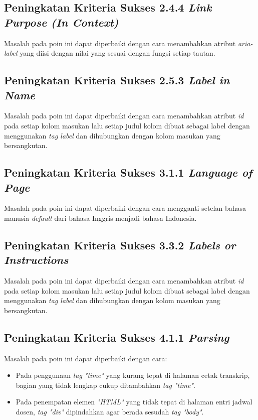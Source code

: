 \subsection{Peningkatan Kriteria Sukses 2.4.4 \textit{Link Purpose (In Context)}}
\label{subsec:peningkatan_kriteria_sukses_2.4.4}
Masalah pada poin ini dapat diperbaiki dengan cara menambahkan atribut \textit{aria-label} yang diisi dengan nilai yang sesuai dengan fungsi setiap tautan.

\subsection{Peningkatan Kriteria Sukses 2.5.3 \textit{Label in Name}}
\label{subsec:peningkatan_kriteria_sukses_2.5.3}
Masalah pada poin ini dapat diperbaiki dengan cara menambahkan atribut \textit{id} pada setiap kolom masukan lalu setiap judul kolom dibuat sebagai label dengan menggunakan \textit{tag label} dan dihubungkan dengan kolom masukan yang bersangkutan.

\subsection{Peningkatan Kriteria Sukses 3.1.1 \textit{Language of Page}}
\label{subsec:peningkatan_kriteria_sukses_3.1.1}
Masalah pada poin ini dapat diperbaiki dengan cara mengganti setelan bahasa manusia \textit{default} dari bahasa Inggris menjadi bahasa Indonesia.

\subsection{Peningkatan Kriteria Sukses 3.3.2 \textit{Labels or Instructions}}
\label{subsec:peningkatan_kriteria_sukses_3.3.2}
Masalah pada poin ini dapat diperbaiki dengan cara menambahkan atribut \textit{id} pada setiap kolom masukan lalu setiap judul kolom dibuat sebagai label dengan menggunakan \textit{tag label} dan dihubungkan dengan kolom masukan yang bersangkutan.

\subsection{Peningkatan Kriteria Sukses 4.1.1 \textit{Parsing}}
\label{subsec:peningkatan_kriteria_sukses_4.1.1}
Masalah pada poin ini dapat diperbaiki dengan cara:

\begin{itemize}
    \item Pada penggunaan \textit{tag "time"} yang kurang tepat di halaman cetak transkrip, bagian yang tidak lengkap cukup ditambahkan \textit{tag "time"}.
    \item Pada penempatan elemen \textit{"HTML"} yang tidak tepat di halaman entri jadwal dosen, \textit{tag "div"} dipindahkan agar berada sesudah \textit{tag "body"}.
\end{itemize}